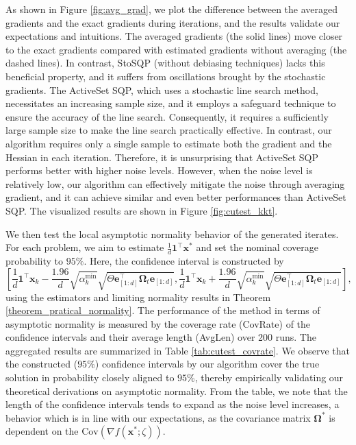\documentclass[aos]{imsart}
\numberwithin{equation}{section}
\theoremstyle{plain}
\newcommand{\michael}[1]{\textcolor{red}{Michael:\ #1}}
\begin{document}
As shown in Figure \ref{fig:avg_grad}, we plot the difference between the averaged gradients and the exact gradients during iterations, and the results validate our expectations and intuitions. The averaged gradients (the solid lines) move closer to the exact gradients compared with estimated gradients without averaging (the dashed lines).
In contrast, StoSQP (without debiasing techniques) lacks this beneficial property, and it suffers from oscillations brought by the stochastic gradients. 
The ActiveSet SQP, which uses a stochastic line search method, necessitates an increasing sample size, and it employs a safeguard technique to ensure the accuracy of the line search. 
Consequently, it requires a sufficiently large sample size to make the line search practically effective. 
In contrast, our algorithm requires only a single sample to estimate both the gradient and the Hessian in each iteration.
Therefore, it is unsurprising that ActiveSet SQP performs better with higher noise levels. 
However, when the noise level is relatively low, our algorithm can effectively mitigate the noise through averaging gradient, and it can achieve similar and even better performances than ActiveSet SQP. 
The visualized results are shown in Figure \ref{fig:cutest_kkt}.


We then test the local asymptotic normality behavior of the generated iterates. For each problem, we aim to estimate $\frac{1}{d}\bm{1}^{\top} \bm{x}^{*}$ and set the nominal coverage probability to $95\%$. Here, the confidence interval is constructed by $$\left[\frac{1}{d}\bm{1}^{\top} \bm{x}_{k} - \frac{1.96}{d}\sqrt{\alpha_k^{\min}}  \sqrt{\Theta \bm{e}_{[1:d]} ^{\top} \bm{\Omega}_{t} \bm{e}_{[1:d]} }, \frac{1}{d}\bm{1}^{\top} \bm{x}_{k} + \frac{1.96}{d}\sqrt{ \alpha_k^{\min}}  \sqrt{\Theta \bm{e}_{[1:d]}^{\top} \bm{\Omega}_{t} \bm{e}_{[1:d]} } \right],$$
using the estimators and limiting normality results in Theorem \ref{theorem_pratical_normality}. The performance of the method in terms of asymptotic normality is measured by the coverage rate (CovRate) of the confidence intervals and their average length (AvgLen) over 200 runs. 
The aggregated results are summarized in Table \ref{tab:cutest_covrate}. We observe that the constructed ($95\%$) confidence intervals by our algorithm cover the true solution in probability closely aligned to $95\%$, thereby empirically validating our theoretical derivations on asymptotic normality. 
From the table, we note that the length of the confidence intervals tends to expand as the noise level increases, a behavior which is in line with our expectations, as the covariance matrix $\bm{\Omega}^{*}$ is dependent on the $\text{Cov}\left( \nabla f(\bm{x}^{*};\zeta)\right)$. 
\end{document}
